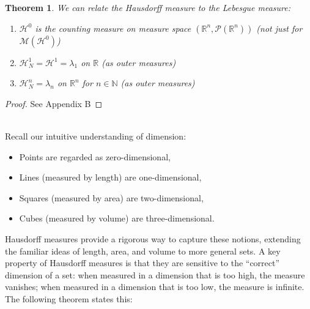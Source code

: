 \documentclass{article}
\theoremstyle{plain}
\newtheorem{thm}{Theorem}[section]
\theoremstyle{definition}
\theoremstyle{remark}
\begin{document}
\begin{thm}\label{thm:lebesgue_haus}
    We can relate the Hausdorff measure to the Lebesgue measure: 
    \begin{enumerate}
        \item $\mathcal{H}^0$ is the counting measure on measure space $(\mathbb{R}^n, \mathcal{P}(\mathbb{R}^n))$ (not just for $\mathcal{M}(\mathcal{H}^0)$)
        \item $\mathcal{H}^1_N=\mathcal{H}^1 = \lambda_1$ on $\mathbb{R}$ (as outer measures)
        \item $\mathcal{H}^n_N = \lambda_n$ on $\mathbb{R}^n$ for $n \in \mathbb{N}$ (as outer measures)
    \end{enumerate}
\end{thm}
\begin{proof}
    See Appendix B
\end{proof}~\\
\noindent Recall our intuitive understanding of dimension: 
\begin{itemize}
    \item Points are regarded as zero-dimensional,
    \item Lines (measured by length) are one-dimensional,
    \item Squares (measured by area) are two-dimensional,
    \item Cubes (measured by volume) are three-dimensional.
\end{itemize}
Hausdorff measures provide a rigorous way to capture these notions, extending the familiar ideas of length, area, and volume to more general sets. 
A key property of Hausdorff measures is that they are sensitive to the ``correct'' dimension of a set: when measured in a dimension that is too high, the measure vanishes; when measured in a dimension that is too low, the measure is infinite. 
The following theorem states this:
\end{document}
